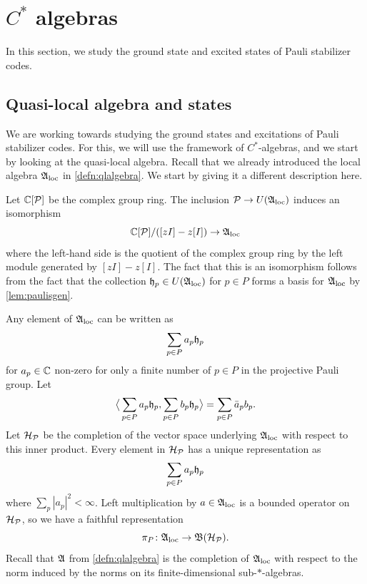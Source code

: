 \documentclass[11pt]{amsart}
\begin{document}
\section{\texorpdfstring{$C^*$}{C*} algebras}

In this section, we study the ground state and excited states of Pauli stabilizer codes.

\subsection{Quasi-local algebra and states}
We are working towards studying the ground states and excitations of Pauli stabilizer codes. For this, we will use the framework of $C^*$-algebras, and we start by looking at the quasi-local algebra.
Recall that we already introduced the local algebra $\mathfrak{A}_{\mathrm{loc}}$ in  \cref{defn:qlalgebra}. We start by giving it a different description here.

Let $\mathbb{C}[\mathcal{P}]$ be the complex group ring. The inclusion $\mathcal{P} \to U(\mathfrak{A}_{\mathrm{loc}})$ induces an isomorphism
\[  \mathbb{C}[\mathcal{P}]/([zI]-z[I]) \to \mathfrak{A}_{\mathrm{loc}}\]
where the left-hand side is the quotient of the complex group ring by the left module generated by $[zI]-z[I]$. The fact that this is an isomorphism follows from the fact that the collection $\mathfrak{h}_p \in U(\mathfrak{A}_{\mathrm{loc}})$ for $p\in P$ forms a basis for $\mathfrak{A}_{\mathrm{loc}}$ by \cref{lem:paulisgen}.

Any element of $\mathfrak{A}_{\mathrm{loc}}$ can be written as
\[ \sum_{p\in P} a_p\mathfrak{h}_p\]
for $a_p \in \mathbb{C}$ non-zero for only a finite number of $p \in P$ in the projective Pauli group. Let
\[\big\langle \sum_{p\in P} a_p\mathfrak{h}_p , \sum_{p\in P} b_p\mathfrak{h}_p\big\rangle = \sum_{p\in P} \bar{a}_pb_p.\]
Let $\mathcal{H}_{\mathcal{P}}$ be the completion of the vector space underlying $\mathfrak{A}_{\mathrm{loc}}$ with respect to this inner product.
Every element in $\mathcal{H}_{\mathcal{P}}$ has a unique representation as
\begin{align}\label{eq:hpexp}
\sum_{p \in P} a_p \mathfrak{h}_p
\end{align}
where $\sum_{p} |a_p|^2 <\infty$. Left multiplication by $a \in\mathfrak{A}_{\mathrm{loc}}$ is a bounded operator on $\mathcal{H}_{\mathcal{P}}$, so we have a faithful representation
\[ \pi_P \colon \mathfrak{A}_{\mathrm{loc}} \to \mathfrak{B}(\mathcal{H}_{\mathcal{P}}).\]
Recall that $\mathfrak{A}$ from  \cref{defn:qlalgebra}  is the completion of $\mathfrak{A}_{\mathrm{loc}}$ with respect to the norm induced by the norms on its finite-dimensional sub-$\ast$-algebras.
\end{document}
